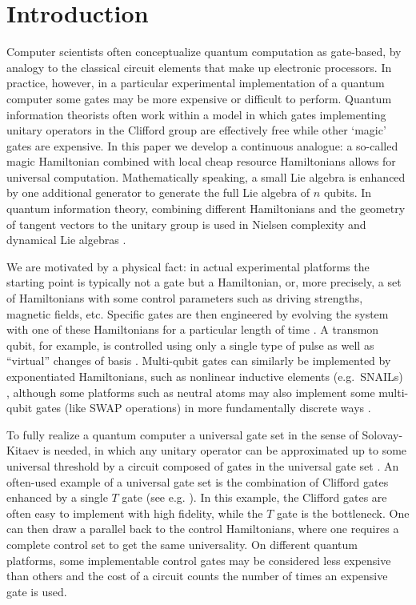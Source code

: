 \documentclass[12pt, a4-paper]{amsart}
\numberwithin{equation}{section}
\begin{document}
\newpage
\tableofcontents


\section{Introduction} \label{ch:jason_introduction}


Computer scientists often conceptualize quantum computation as gate-based, by analogy to the classical circuit elements that make up electronic processors. In practice, however, in a particular experimental implementation of a quantum computer some gates may be more expensive or difficult to perform. Quantum information theorists often work within a model \cite{Bravyi:2004isx} in which gates implementing unitary operators in the Clifford group are effectively free while other `magic' gates are expensive. In this paper we develop a continuous analogue: a so-called magic Hamiltonian combined with local cheap resource Hamiltonians 
allows for universal computation. Mathematically speaking, a small Lie algebra is enhanced by one additional generator to generate the full Lie algebra of $n$ qubits.
In quantum information theory, combining different Hamiltonians and the geometry of tangent vectors to the unitary group is used in Nielsen complexity \cite{Nielsen:2005mkt} and dynamical Lie algebras \cite{DAlessandro:2024eff,Aguilar2024FullClassificationLie}.


We are motivated by a physical fact: in actual experimental platforms the starting point is typically not a gate but a Hamiltonian, or, more precisely, a set of Hamiltonians with some control parameters such as driving strengths, magnetic fields, etc. Specific gates are then engineered by evolving the system with one of these Hamiltonians for a particular length of time \cite{DeFouquieres2011SecondEngineering, 2021PulseSystems}.
A transmon qubit, for example, is controlled using only a single type of pulse as well as ``virtual'' changes of basis \cite{McKay:2017rej,Kjaergaard202617SuperconductingQubits}. Multi-qubit gates can similarly be implemented by exponentiated Hamiltonians, such as nonlinear inductive elements (e.g.\ SNAILs) \cite{McKinney2023Co-DesignedComputers}, although some platforms such as neutral atoms may also implement some multi-qubit gates (like SWAP operations) in more fundamentally discrete ways \cite{Henriet2020QuantumAtoms}.

To fully realize a quantum computer a universal gate set in the sense of Solovay-Kitaev is needed, in which any unitary operator can be approximated up to some universal threshold by a circuit composed of gates in the universal gate set \cite{KSV, dawson2006SolovayKitaev}. 
An often-used example of a universal gate set is the combination of Clifford gates enhanced by a single $T$ gate (see e.g. \cite{Bravyi:2004isx}). In this example, the Clifford gates are often easy to implement with high fidelity, while the $T$ gate is the bottleneck. One can then draw a parallel back to the control Hamiltonians, where one requires a complete control set to get the same universality. On different quantum platforms, some implementable control gates may be considered less expensive than others and the cost of a circuit counts the number of times an expensive gate is used. 
\end{document}
